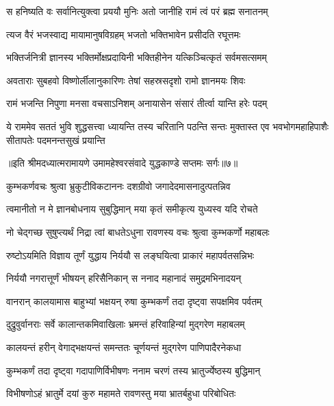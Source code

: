 \twolineshloka
{स हनिष्यति वः सर्वानित्युक्त्वा प्रययौ मुनिः}
{अतो जानीहि रामं त्वं परं ब्रह्म सनातनम्} %

\twolineshloka
{त्यज वैरं भजस्वाद्य मायामानुषविग्रहम्}
{भजतो भक्तिभावेन प्रसीदति रघूत्तमः} %

\twolineshloka
{भक्तिर्जनित्री ज्ञानस्य भक्तिर्मोक्षप्रदायिनी}
{भक्तिहीनेन यत्किञ्चित्कृतं सर्वमसत्समम्} %

\twolineshloka
{अवताराः सुबहवो विष्णोर्लीलानुकारिणः}
{तेषां सहस्रसदृशो रामो ज्ञानमयः शिवः} %

\twolineshloka
{रामं भजन्ति निपुणा मनसा वचसाऽनिशम्}
{अनायासेन संसारं तीर्त्वा यान्ति हरेः पदम्} %

\fourlineindentedshloka
{ये राममेव सततं भुवि शुद्धसत्त्वा}
{ध्यायन्ति तस्य चरितानि पठन्ति सन्तः}
{मुक्तास्त एव भवभोगमहाहिपाशैः}
{सीतापतेः पदमनन्तसुखं प्रयान्ति} %

{॥इति श्रीमदध्यात्मरामायणे उमामहेश्वरसंवादे युद्धकाण्डे सप्तमः
सर्गः॥७॥
}





\twolineshloka
{कुम्भकर्णवचः श्रुत्वा भ्रुकुटीविकटाननः}
{दशग्रीवो जगादेदमासनादुत्पतन्निव} %

\twolineshloka
{त्वमानीतो न मे ज्ञानबोधनाय सुबुद्धिमान्}
{मया कृतं समीकृत्य युध्यस्व यदि रोचते} %

\twolineshloka
{नो चेद्गच्छ सुषुप्त्यर्थं निद्रा त्वां बाधतेऽधुना}
{रावणस्य वचः श्रुत्वा कुम्भकर्णो महाबलः} %

\twolineshloka
{रुष्टोऽयमिति विज्ञाय तूर्णं युद्धाय निर्ययौ}
{स लङ्घयित्वा प्राकारं महापर्वतसन्निभः} %

\twolineshloka
{निर्ययौ नगरात्तूर्णं भीषयन् हरिसैनिकान्}
{स ननाद महानादं समुद्रमभिनादयन्} %

\twolineshloka
{वानरान् कालयामास बाहुभ्यां भक्षयन् रुषा}
{कुम्भकर्णं तदा दृष्ट्वा सपक्षमिव पर्वतम्} %

\twolineshloka
{दुद्रुवुर्वानराः सर्वे कालान्तकमिवाखिलाः}
{भ्रमन्तं हरिवाहिन्यां मुद्गरेण महाबलम्} %

\twolineshloka
{कालयन्तं हरीन् वेगाद्भक्षयन्तं समन्ततः}
{चूर्णयन्तं मुद्गरेण पाणिपादैरनेकधा} %

\twolineshloka
{कुम्भकर्णं तदा दृष्ट्वा गदापाणिर्विभीषणः}
{ननाम चरणं तस्य भ्रातुर्ज्येष्ठस्य बुद्धिमान्} %

\twolineshloka
{विभीषणोऽहं भ्रातुर्मे दयां कुरु महामते}
{रावणस्तु मया भ्रातर्बहुधा परिबोधितः} %

